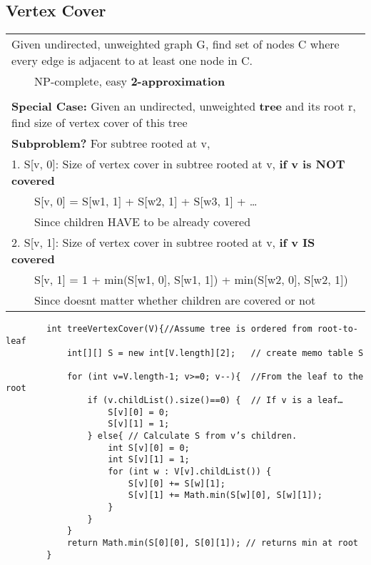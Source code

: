 \documentclass{article}
\newcommand{\tabitem}{~~\llap{\textbullet}~~}
\begin{document}
    \pagebreak

    \subsection{Vertex Cover}

    \begin{tabular}{l}
        Given undirected, unweighted graph G, find set of nodes C where every edge is adjacent to at least one node in C.\\
        \tabitem NP-complete, easy \textbf{2-approximation}\\\\
        \textbf{Special Case:} Given an undirected, unweighted \textbf{tree } and its root r, find size of vertex cover of this tree\\
        \textbf{Subproblem?} For subtree rooted at v,\\
        1. S[v, 0]: Size of vertex cover in subtree rooted at v, \textbf{if v is NOT covered}\\
        \tabitem S[v, 0] = S[w1, 1] + S[w2, 1] + S[w3, 1] + …\\
        \tabitem Since children HAVE to be already covered\\
        2. S[v, 1]: Size of vertex cover in subtree rooted at v, \textbf{if v IS covered}\\
        \tabitem S[v, 1] = 1 + min(S[w1, 0], S[w1, 1]) + min(S[w2, 0], S[w2, 1])\\
        \tabitem Since doesnt matter whether children are covered or not\\
    \end{tabular}

    \begin{verbatim}
        int treeVertexCover(V){//Assume tree is ordered from root-to-leaf
            int[][] S = new int[V.length][2];   // create memo table S

            for (int v=V.length-1; v>=0; v--){  //From the leaf to the root
                if (v.childList().size()==0) {  // If v is a leaf…
                    S[v][0] = 0;
                    S[v][1] = 1;
                } else{ // Calculate S from v’s children.
                    int S[v][0] = 0;
                    int S[v][1] = 1;
                    for (int w : V[v].childList()) {
                        S[v][0] += S[w][1];
                        S[v][1] += Math.min(S[w][0], S[w][1]);
                    }
                }
            }
            return Math.min(S[0][0], S[0][1]); // returns min at root
        }
    \end{verbatim}
    
\end{document}
